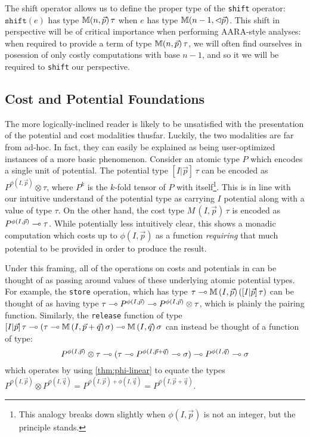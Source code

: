 The shift operator allows us to define the proper type of the \texttt{shift} operator: $\texttt{shift}(e)$ has type $\mathbb{M} (n,\vec{p}) \, \tau$ when $e$ has type $\mathbb{M} (n-1,\lhd\vec{p})$. This shift in perspective will be of critical importance when performing AARA-style analyses: when required to provide a term of type $\mathbb{M} (n,\vec{p}) \, \tau$, we will often find ourselves in posession of only costly computations with base $n-1$, and so it we will be required to \texttt{shift} our perspective.

\subsection{Cost and Potential Foundations}
The more logically-inclined reader is likely to be unsatisfied with the presentation of the potential and cost modalities thusfar. Luckily, the two modalities are far from ad-hoc. In fact, they can easily be explained as being user-optimized instances of a more basic phenomenon. Consider an atomic type $P$ which encodes a single unit of potential. The potential type $[I|\vec{p}] \, \tau$ can be encoded as $P^{\phi(I,\vec{p})} \otimes \tau$, where $P^k$ is the $k$-fold tensor of $P$ with itself\footnote{
This analogy breaks down slightly when $\phi(I,\vec{p})$ is not an integer, but the principle stands.
}. This is in line with our intuitive understand of the potential type as carrying $I$ potential along with a value of type $\tau$. On the other hand, the cost type $M \,(I,\vec{p}) \, \tau$ is encoded as $P^{\phi(I,\vec{p})} \multimap \tau$. While potentially less intuitively clear, this shows a monadic computation which costs up to $\phi(I,\vec{p})$ as a function \textit{requiring} that much potential to be provided in order to produce the result.

Under this framing, all of the operations on costs and potentials in \dlambdaamor can be thought of as passing around values of these underlying atomic potential types. For example, the \texttt{store} operation, which has type $\tau \multimap \mathbb{M} \, (I,\vec{p}) \, ([I|\vec{p}] \, \tau)$ can be thought of as having type $\tau \multimap P^{\phi(I,\vec{p})} \multimap P^{\phi(I,\vec{p})} \otimes \tau$, which is plainly the pairing function. Similarly, the \texttt{release} function of type $[I|\vec{p}] \, \tau \multimap (\tau \multimap \mathbb{M} \, (I,\vec{p} + \vec{q}) \, \sigma) \multimap \mathbb{M} \, (I,\vec{q})\, \sigma$ can instead be thought of a function of type:
$$
P^{\phi(I,\vec{p})} \otimes \tau \multimap (\tau \multimap P^{\phi(I,\vec{p} + \vec{q})} \multimap \sigma) \multimap P^{\phi(I,\vec{q})} \multimap \sigma
$$
which operates by using \autoref{thm:phi-linear} to equate the types $P^{\phi(I,\vec{p})} \otimes P^{\phi(I,\vec{q})} = P^{\phi(I,\vec{p}) + \phi(I,\vec{q})} = P^{\phi(I,\vec{p} + \vec{q})}$.


